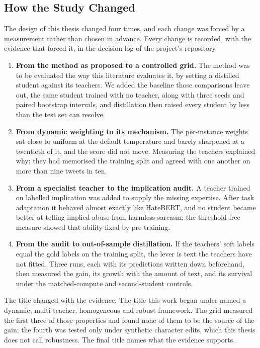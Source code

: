 \subsection{How the Study Changed}
\label{sec:6.3}
The design of this thesis changed four times, and each change was forced by a measurement rather than
chosen in advance. Every change is recorded, with the evidence that forced it, in the decision log of
the project's repository.
\begin{enumerate}
  \item \textbf{From the method as proposed to a controlled grid.} The method was to be evaluated the
    way this literature evaluates it, by setting a distilled student against its teachers. We added the
    baseline those comparisons leave out, the same student trained with no teacher, along with three
    seeds and paired bootstrap intervals, and distillation then raised every student by less than the
    test set can resolve.
  \item \textbf{From dynamic weighting to its mechanism.} The per-instance weights sat close to uniform at
    the default temperature and barely sharpened at a twentieth of it, and the score did not move.
    Measuring the teachers explained why: they had memorised the training split and agreed with one
    another on more than nine tweets in ten.
  \item \textbf{From a specialist teacher to the implication audit.} A teacher trained on labelled
    implication was added to supply the missing expertise. After task adaptation it behaved almost exactly
    like HateBERT, and no student became better at telling implied abuse from harmless sarcasm; the
    threshold-free measure showed that ability fixed by pre-training.
  \item \textbf{From the audit to out-of-sample distillation.} If the teachers' soft labels equal the gold
    labels on the training split, the lever is text the teachers have not fitted. Three runs, each with
    its predictions written down beforehand, then measured the gain, its growth with the amount of text,
    and its survival under the matched-compute and second-student controls.
\end{enumerate}
The title changed with the evidence. The title this work began under named a dynamic, multi-teacher,
homogeneous and robust framework. The grid measured the first three of those properties and found none of them to
be the source of the gain; the fourth was tested only under synthetic character edits, which this
thesis does not call robustness. The final title names what the evidence supports.
